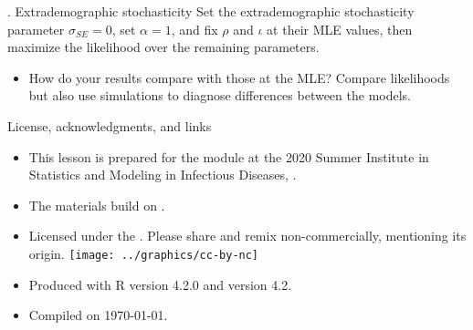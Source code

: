 \begin{frame}{\myexercise. Extrademographic stochasticity}
  Set the extrademographic stochasticity parameter $\sigma_{SE}=0$, set $\alpha=1$, and fix $\rho$ and $\iota$ at their MLE values, then maximize the likelihood over the remaining parameters.
  \begin{itemize}
  \item
    How do your results compare with those at the MLE? Compare likelihoods but also use simulations to diagnose differences between the models.
  \end{itemize}
\end{frame}


\begin{frame}{License, acknowledgments, and links}

  \begin{itemize}
  \item
    This lesson is prepared for the  module at the 2020 Summer Institute in Statistics and Modeling in Infectious Diseases, .

  \item
    The materials build on .

  \item
    Licensed under the .
    Please share and remix non-commercially, mentioning its origin.
    \texttt{[image: ../graphics/cc-by-nc]}

  \item
    Produced with R version 4.2.0 and  version 4.2.

  \item
    Compiled on \today.

  \end{itemize}

  

\end{frame}


